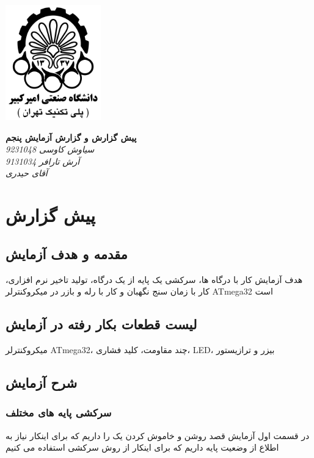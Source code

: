 \documentclass[12pt,a4paper]{article}
\begin{document}
\begin{persian}
\begin{center}
	\thispagestyle{empty}
	\centerline{\includegraphics[height=5cm]{logo.png}}
	\vspace{20mm}
	\textbf{\Huge{پیش گزارش و گزارش آزمایش پنجم}}\\
	\vspace{10mm}
	\textit{\huge{سیاوش کاوسی 9231048 \\ آرش تارافر 9131034}}\\
	\vspace{10mm}
	\textit{\huge{آقای حیدری}}\\
\end{center}	

	\newpage
	\section{پیش گزارش}
	\subsection{مقدمه و هدف آزمایش}
		هدف آزمایش کار با درگاه ها، سرکشی یک پایه از یک درگاه، تولید تاخیر نرم افزاری، کار با زمان سنج نگهبان و کار با رله و بازر در میکروکنترلر ATmega32 است
	\subsection{لیست قطعات بکار رفته در آزمایش}
		میکروکنترلر ATmega32، چند مقاومت، کلید فشاری، LED، بیزر و ترازیستور
	\subsection{شرح آزمایش}
	
	\subsubsection{سرکشی پایه های مختلف}	
		در قسمت اول آزمایش قصد روشن و خاموش کردن یک  را داریم که برای اینکار نیاز به اطلاع از وضعیت پایه  داریم که برای اینکار از روش سرکشی استفاده می کنیم
		

\end{persian}
\end{document}
